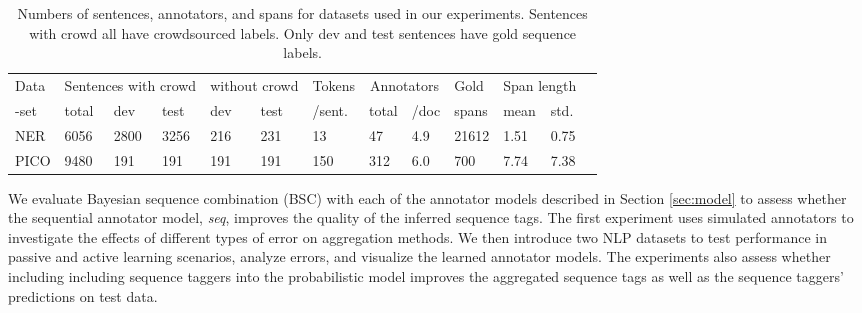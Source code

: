 \begin{table}[t]
\small
\begin{tabularx}{\textwidth}{ X X X X X X l l l X X X X} \toprule
Data & \multicolumn{3}{c}{Sentences with crowd} & \multicolumn{2}{c}{without crowd} & Tokens & \multicolumn{2}{c}{Annotators} & Gold & \multicolumn{2}{c}{Span length}  \\
-set & total & dev & test & dev & test %
& /sent. & total & /doc & spans & mean & std.  \\
\toprule
NER & 6056 & 2800 & 3256 & 216 & 231 & 13 & 47 & 4.9 & 21612 %
& 1.51 & 0.75 \\
PICO & 9480 & 191 & 191 & 191 & 191 & 150 & 312 & 6.0 & 700 & 7.74 & 7.38  \\ \bottomrule
\end{tabularx}
\label{tab:datasets}
\caption{Numbers of sentences, annotators, and spans for datasets used in our experiments. Sentences with crowd all have crowdsourced labels. Only dev and test sentences have gold sequence labels.}
\end{table}
We evaluate Bayesian sequence combination (BSC) with each of the 
annotator models described in Section \ref{sec:model}
to assess whether the sequential annotator model, \emph{seq},
improves the quality of the inferred sequence tags. 
The first experiment uses simulated annotators to investigate the effects of different 
types of error on aggregation methods.
We then introduce two NLP datasets to 
test performance in passive and active learning scenarios, 
analyze errors, and
visualize the learned annotator models.
The experiments also assess whether including including sequence taggers into the probabilistic model
improves the aggregated sequence tags 
as well as the sequence taggers' predictions on test data.

